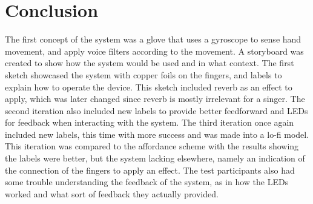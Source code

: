 \section{Conclusion}

The first concept of the system was a glove that uses a gyroscope to sense hand movement, and apply voice filters according to the movement. A storyboard was created to show how the system would be used and in what context. The first sketch showcased the system with copper foils on the fingers, and labels to explain how to operate the device. This sketch included reverb as an effect to apply, which was later changed since reverb is mostly irrelevant for a singer. The second iteration also included new labels to provide better feedforward and LEDs for feedback when interacting with the system. The third iteration once again included new labels, this time with more success and was made into a lo-fi model. This iteration was compared to the affordance scheme with the results showing the labels were better, but the system lacking elsewhere, namely an indication of the connection of the fingers to apply an effect. The test participants also had some trouble understanding the feedback of the system, as in how the LEDs worked and what sort of feedback they actually provided.